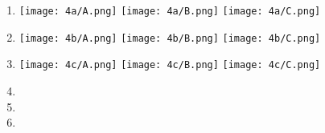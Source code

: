 \begin{question}
    
    \begin{enumerate}[label=\textbf{\alph*})]
        \item 
        \begin{minipage}{\linewidth}
            \centering
            \texttt{[image: 4a/A.png]}
            \hspace*{1cm}
            \texttt{[image: 4a/B.png]}
            \hspace*{1cm}
            \texttt{[image: 4a/C.png]}
        \end{minipage}

        \item 
        \begin{minipage}{\linewidth}
            \centering
            \texttt{[image: 4b/A.png]}
            \hspace*{1cm}
            \texttt{[image: 4b/B.png]}
            \hspace*{1cm}
            \texttt{[image: 4b/C.png]}
        \end{minipage}
        \item 
        \begin{minipage}{\linewidth}
            \centering
            \texttt{[image: 4c/A.png]}
            \hspace*{1cm}
            \texttt{[image: 4c/B.png]}
            \hspace*{1cm}
            \texttt{[image: 4c/C.png]}
        \end{minipage}
        \item 

        \item 

        \item 

    \end{enumerate}
\end{question}